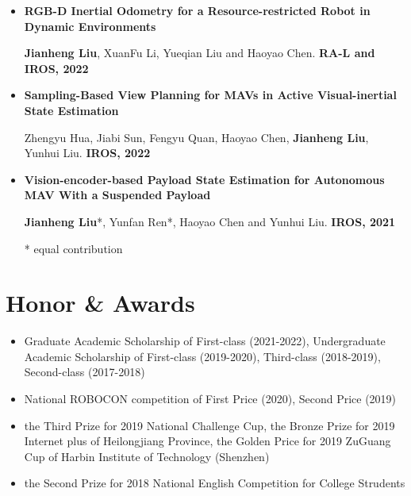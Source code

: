 \documentclass[11pt,a4paper,sans]{moderncv}        %
\begin{document}
{\begin{itemize}
    \vspace{3pt}


\item{\textbf{RGB-D Inertial Odometry for a Resource-restricted Robot in Dynamic Environments}

\small{\textbf{Jianheng Liu}, XuanFu Li, Yueqian Liu and Haoyao Chen. \textbf{RA-L and IROS, 2022}}
}

\vspace{3pt}

\item{\textbf{Sampling-Based View Planning for MAVs in Active Visual-inertial State Estimation}

\small{Zhengyu Hua, Jiabi Sun, Fengyu Quan, Haoyao Chen, \textbf{Jianheng Liu}, Yunhui Liu. \textbf{IROS, 2022}}
}

\vspace{3pt}

\item{\textbf{Vision-encoder-based Payload State Estimation for Autonomous MAV With a Suspended Payload}

\small{\textbf{Jianheng Liu}*, Yunfan Ren*, Haoyao Chen and Yunhui Liu. \textbf{IROS, 2021}}
}

\footnotesize{* equal contribution}

\end{itemize}

\section{Honor \& Awards}

\vspace{6pt}

\begin{itemize}

\item{Graduate Academic Scholarship of First-class (2021-2022), Undergraduate Academic Scholarship of First-class (2019-2020), Third-class (2018-2019), Second-class (2017-2018)}

\item{National ROBOCON competition of First Price (2020), Second Price (2019)}

\item{the Third Prize for 2019 National Challenge Cup, the Bronze Prize for 2019 Internet plus of Heilongjiang Province, the Golden Price for 2019  ZuGuang Cup of Harbin Institute of Technology (Shenzhen)}

\item{the Second Prize for 2018 National English Competition for College Strudents}


\end{itemize}}
\end{document}

